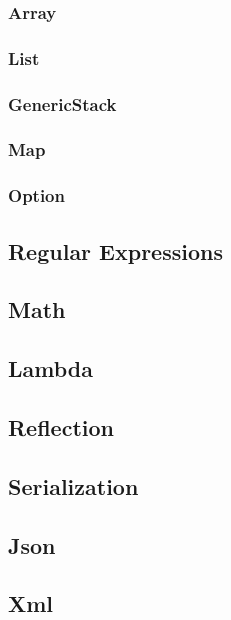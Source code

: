 \documentclass{article}
\begin{document}
\subsubsection{Array}
\label{Array}

\subsubsection{List}
\subsubsection{GenericStack}
\subsubsection{Map}
\label{Map}
\subsubsection{Option}

\subsection{Regular Expressions}

\subsection{Math}

\subsection{Lambda}
\label{Lambda}

\subsection{Reflection}
\label{Reflection}

\subsection{Serialization}

\subsection{Json}

\subsection{Xml}
\end{document}
